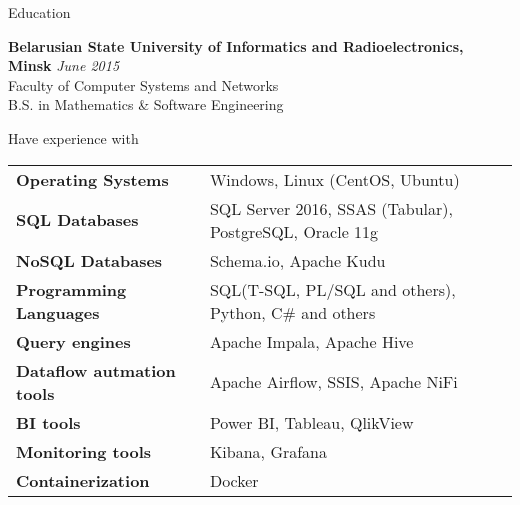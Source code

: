 \documentclass{resume} %
\begin{document}

\begin{rSection}{Education}

{\bf Belarusian State University of Informatics and Radioelectronics, Minsk} \hfill {\em June 2015} \\ 
Faculty of Computer Systems and Networks \\
B.S. in Mathematics \& Software Engineering \\

\end{rSection}


\begin{rSection}{Have experience with}

\begin{tabular}{ @{} >{\bfseries}l @{\hspace{6ex}} l }
Operating Systems      & Windows, Linux (CentOS, Ubuntu) \smallskip \\
SQL Databases          & SQL Server 2016, SSAS (Tabular), PostgreSQL, Oracle 11g \smallskip \\
NoSQL Databases        & Schema.io, Apache Kudu  \smallskip \\
Programming Languages  & SQL(T-SQL, PL/SQL and others), Python, C\# and others \smallskip \\
Query engines          & Apache Impala, Apache Hive \smallskip \\
Dataflow autmation tools & Apache Airflow, SSIS, Apache NiFi \smallskip \\
BI tools               & Power BI, Tableau, QlikView \smallskip \\
Monitoring tools       & Kibana, Grafana \smallskip \\
Containerization       & Docker \smallskip \\
\end{tabular}

\end{rSection}

\end{document}
